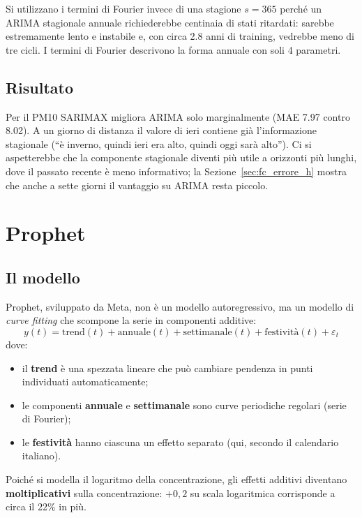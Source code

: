 \documentclass[11pt]{report}
\begin{document}
Si utilizzano i termini di Fourier invece di una stagione $s=365$ perché un ARIMA
stagionale annuale richiederebbe centinaia di stati ritardati: sarebbe
estremamente lento e instabile e, con circa \num{2.8} anni di training, vedrebbe
meno di tre cicli. I termini di Fourier descrivono la forma annuale con soli 4
parametri.

\subsection{Risultato}
Per il PM10 SARIMAX migliora ARIMA solo marginalmente (MAE \num{7.97} contro
\num{8.02}). A un giorno di distanza il valore di ieri contiene già l'informazione
stagionale (``è inverno, quindi ieri era alto, quindi oggi sarà alto''). Ci si
aspetterebbe che la componente stagionale diventi più utile a orizzonti più lunghi,
dove il passato recente è meno informativo; la Sezione~\ref{sec:fc_errore_h} mostra
che anche a sette giorni il vantaggio su ARIMA resta piccolo.

\section{Prophet}
\label{sec:fc_prophet}

\subsection{Il modello}
Prophet, sviluppato da Meta, non è un modello autoregressivo, ma un modello di
\emph{curve fitting} che scompone la serie in componenti additive:
\[ y(t) = \text{trend}(t) + \text{annuale}(t) + \text{settimanale}(t) + \text{festività}(t) + \varepsilon_t \]
dove:
\begin{itemize}
  \item il \textbf{trend} è una spezzata lineare che può cambiare pendenza in punti
        individuati automaticamente;
  \item le componenti \textbf{annuale} e \textbf{settimanale} sono curve
        periodiche regolari (serie di Fourier);
  \item le \textbf{festività} hanno ciascuna un effetto separato (qui, secondo il
        calendario italiano).
\end{itemize}
Poiché si modella il logaritmo della concentrazione, gli effetti additivi
diventano \textbf{moltiplicativi} sulla concentrazione: $+0{,}2$ su scala
logaritmica corrisponde a circa il 22\% in più.
\end{document}
